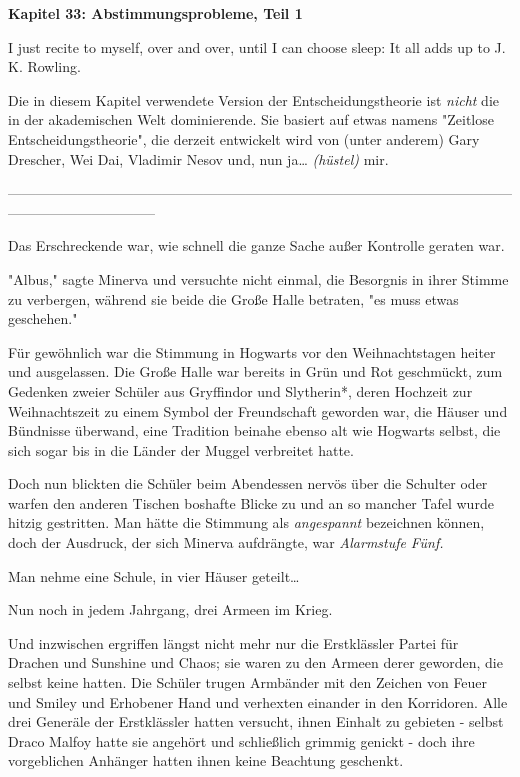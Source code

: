

\hypertarget{abstimmungsprobleme-teil-1}{%

\textbf{Kapitel 33: Abstimmungsprobleme, Teil 1\\ }

I just recite to myself, over and over, until I can choose sleep: It all adds up to J. K. Rowling.

Die in diesem Kapitel verwendete Version der Entscheidungstheorie ist \emph{nicht} die in der akademischen Welt dominierende. Sie basiert auf etwas namens "Zeitlose Entscheidungstheorie", die derzeit entwickelt wird von (unter anderem) Gary Drescher, Wei Dai, Vladimir Nesov und, nun ja… \emph{(hüstel)} mir.

--------------------------------------------------------------------------------------------------------------------------------------------

Das Erschreckende war, wie schnell die ganze Sache außer Kontrolle geraten war.

"Albus," sagte Minerva und versuchte nicht einmal, die Besorgnis in ihrer Stimme zu verbergen, während sie beide die Große Halle betraten, "es muss etwas geschehen."

Für gewöhnlich war die Stimmung in Hogwarts vor den Weihnachtstagen heiter und ausgelassen. Die Große Halle war bereits in Grün und Rot geschmückt, zum Gedenken zweier Schüler aus Gryffindor und Slytherin*, deren Hochzeit zur Weihnachtszeit zu einem Symbol der Freundschaft geworden war, die Häuser und Bündnisse überwand, eine Tradition beinahe ebenso alt wie Hogwarts selbst, die sich sogar bis in die Länder der Muggel verbreitet hatte.

Doch nun blickten die Schüler beim Abendessen nervös über die Schulter oder warfen den anderen Tischen boshafte Blicke zu und an so mancher Tafel wurde hitzig gestritten. Man hätte die Stimmung als \emph{angespannt} bezeichnen können, doch der Ausdruck, der sich Minerva aufdrängte, war \emph{Alarmstufe} \emph{Fünf.}

Man nehme eine Schule, in vier Häuser geteilt…

Nun noch in jedem Jahrgang, drei Armeen im Krieg.

Und inzwischen ergriffen längst nicht mehr nur die Erstklässler Partei für Drachen und Sunshine und Chaos; sie waren zu den Armeen derer geworden, die selbst keine hatten. Die Schüler trugen Armbänder mit den Zeichen von Feuer und Smiley und Erhobener Hand und verhexten einander in den Korridoren. Alle drei Generäle der Erstklässler hatten versucht, ihnen Einhalt zu gebieten - selbst Draco Malfoy hatte sie angehört und schließlich grimmig genickt - doch ihre vorgeblichen Anhänger hatten ihnen keine Beachtung geschenkt.

}
